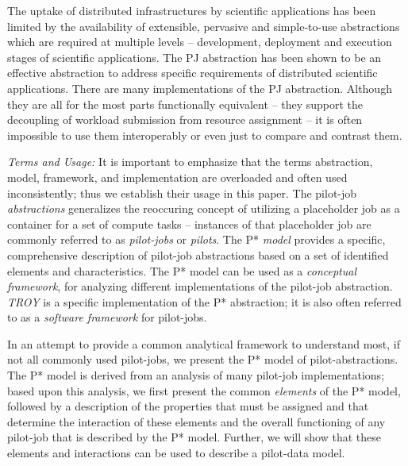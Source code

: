 \documentclass[conference,final]{IEEEtran}
\newcommand{\alnote}[1]{ {\textcolor{blue} { ***andre: #1 }}}
\newcommand{\alnote}[1]{}
\begin{document}



The uptake of distributed infrastructures by scientific applications
has been limited by the availability of extensible, pervasive and
simple-to-use abstractions which are required at multiple levels –
development, deployment and execution stages of scientific
applications. The PJ abstraction has been shown to be an effective
abstraction to address specific requirements of distributed scientific
applications. There are many implementations of the PJ abstraction.
Although they are all for the most parts functionally equivalent --
they support the decoupling of workload submission from resource
assignment -- it is often impossible to use them interoperably or even
just to compare and contrast them.

\emph{Terms and Usage:} It is important to emphasize that the terms
abstraction, model, framework, and implementation are overloaded and
often used inconsistently; thus we establish their usage in this
paper. The pilot-job \emph{ abstractions} generalizes the reoccuring
concept of utilizing a placeholder job as a container for a set of
compute tasks -- instances of that placeholder job are commonly 
referred to as \emph{pilot-jobs} or \emph{pilots}.
The P* \emph{model} provides a specific, comprehensive description of
pilot-job abstractions based on a set of identified elements and
characteristics.
The P* model can be used as a {\it conceptual framework}, 
for analyzing different implementations of the pilot-job
abstraction. \emph{TROY} is a specific implementation of the P*
abstraction; it is also often referred to as a {\it software framework}
for pilot-jobs.

In an attempt to provide a common analytical framework to understand
most, if not all commonly used pilot-jobs, we
present the P* model of pilot-abstractions. The P* model is derived
from an analysis of many pilot-job implementations; based upon this
analysis, we first present the common {\it elements} of the P* model,
followed by a description of the properties that must be assigned and
that determine the interaction of these elements and the overall
functioning of any pilot-job that is described by the P*
model. Further, we will show that these elements and interactions can
be used to describe a pilot-data model.
\end{document}
